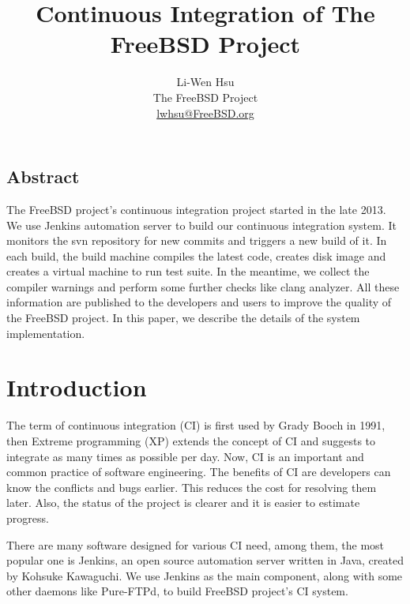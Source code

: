 \documentclass[a4paper,twocolumn,10pt]{article}
\begin{document}
\date{}

\title{\Large \bf Continuous Integration of The FreeBSD Project}

\author{
{\rm Li-Wen Hsu}\\
The FreeBSD Project\\
\normalsize \href{mailto:lwhsu@FreeBSD.org}{lwhsu@FreeBSD.org}
}

\maketitle

\thispagestyle{empty}

\subsection*{Abstract}
The FreeBSD project's continuous integration project started in the late 2013.
We use Jenkins automation server to build our continuous integration system.
It monitors the svn repository for new commits and triggers a new build of it.
In each build, the build machine compiles the latest code, creates disk image
and creates a virtual machine to run test suite. In the meantime, we collect
the compiler warnings and perform some further checks like clang analyzer. All
these information are published to the developers and users to improve the
quality of the FreeBSD project. In this paper, we describe the details of the
system implementation.

\section{Introduction}

The term of continuous integration (CI) is first used by Grady Booch in 1991,
then Extreme programming (XP) extends the concept of CI and suggests to
integrate as many times as possible per day. Now, CI is an important and common
practice of software engineering. The benefits of CI are developers can know
the conflicts and bugs earlier. This reduces the cost for resolving them later.
Also, the status of the project is clearer and it is easier to estimate
progress.

There are many software designed for various CI need, among them, the most
popular one is Jenkins, an open source automation server written in Java,
created by Kohsuke Kawaguchi. We use Jenkins as the main component, along with
some other daemons like Pure-FTPd, to build FreeBSD project's CI system.
\end{document}
